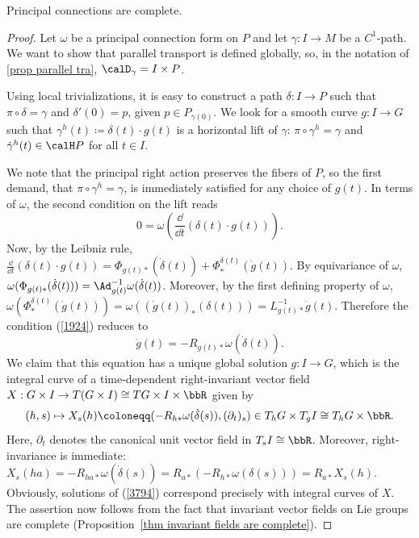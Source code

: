 \begin{prop}
    Principal connections are complete.
\end{prop}
\begin{proof}
    Let $\omega$ be a principal connection form on $P$ and let $\gamma:I\to M$ be a $C^1$-path. We want to show that parallel transport is defined globally, so, in the notation of \ref{prop parallel tra}, $\calD_\gamma=I\times P$.

    Using local trivializations, it is easy to construct a path $\delta:I\to P$ such that $\pi\circ\delta=\gamma$ and $\delta'(0)=p$, given $p\in P_{\gamma(0)}$. We look for a smooth curve $g:I\to G$ such that $\gamma^h(t)\coloneqq \delta(t)\cdot g(t)$ is a horizontal lift of $\gamma$: $\pi\circ\gamma^h=\gamma$ and $\dot\gamma^h(t)\in \calH P$ for all $t\in I$. 

    We note that the principal right action preserves the fibers of $P$, so the first demand, that $\pi\circ \gamma^h=\gamma$, is immediately satisfied for any choice of $g(t)$. In terms of $\omega$, the second condition on the lift reads
    \[0=\omega\left(\frac{\dd}{\dd t}(\delta(t)\cdot g(t))\right).\label{1924}\]
    Now, by the Leibniz rule, $\frac{\dd}{\dd t}(\delta(t)\cdot g(t))=\Phi_{g(t)\ast}(\dot\delta(t))+\Phi^{\delta(t)}_\ast(\dot g(t))$. By equivariance of $\omega$, $\omega(\Phi_{g(t)\ast}(\dot\delta(t)))=\Ad_{g(t)}^{-1}\omega(\dot\delta(t))$. Moreover, by the first defining property of $\omega$, $\omega(\Phi^{\delta(t)}_\ast(\dot g(t)))=\omega((\dot g(t))_{\ast}(\delta(t)))=L_{g(t)\ast}^{-1}\dot g(t)$. Therefore the condition (\ref{1924}) reduces to
    \[\dot g(t)=-R_{g(t)\ast}\omega(\dot\delta(t)).\label{3794}\]
    We claim that this equation has a unique global solution $g:I\to G$, which is the integral curve of a time-dependent right-invariant vector field $X: G\times I\to T(G\times I)\cong TG\times I\times \bbR$ given by
    \[(h,s)\mapsto X_s(h)\coloneqq (-R_{h\ast}\omega(\dot\delta(s)),(\partial_t)_s)\in T_hG\times T_gI\cong T_hG\times \bbR.\]
    Here, $\partial_t$ denotes the canonical unit vector field in $T_sI\cong\bbR$. Moreover, right-invariance is immediate: $X_s(ha)=-R_{ha\ast}\omega(\dot\delta(s))=R_{a\ast}(-R_{h\ast}\omega(\delta(s)))=R_{a\ast}X_s(h)$. Obviously, solutions of (\ref{3794}) correspond precisely with integral curves of $X$. The assertion now follows from the fact that invariant vector fields on Lie groups are complete (Proposition~\ref{thm invariant fields are complete}).
\end{proof}

